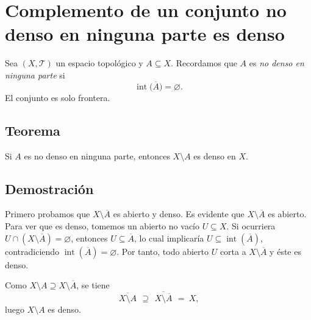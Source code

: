 \documentclass[12pt]{article}
\begin{document}
\section*{Complemento de un conjunto no denso en ninguna parte es denso}

Sea $(X,\mathcal T)$ un espacio topológico y $A\subseteq X$.
Recordamos que $A$ es \emph{no denso en ninguna parte} si
\[
\operatorname{int}\big(\overline{A}\big)=\varnothing.
\]
El conjunto es solo frontera.
\subsection*{Teorema}
Si $A$ es no denso en ninguna parte, entonces $X\setminus A$ es denso en $X$.

\subsection*{Demostración}
Primero probamos que $X\setminus\overline{A}$ es abierto y denso.
Es evidente que $X\setminus\overline{A}$ es abierto. Para ver que es denso,
tomemos un abierto no vacío $U\subseteq X$. Si ocurriera
$U\cap (X\setminus\overline{A})=\varnothing$, entonces $U\subseteq \overline{A}$,
lo cual implicaría $U\subseteq \operatorname{int}(\overline{A})$, contradiciendo
$\operatorname{int}(\overline{A})=\varnothing$. Por tanto,
todo abierto $U$ corta a $X\setminus\overline{A}$ y éste es denso.

Como $X\setminus A \supseteq X\setminus\overline{A}$, se tiene
\[
\overline{\,X\setminus A\,}\ \supseteq\ \overline{\,X\setminus\overline{A}\,}\ =\ X,
\]
luego $X\setminus A$ es denso.
\end{document}
